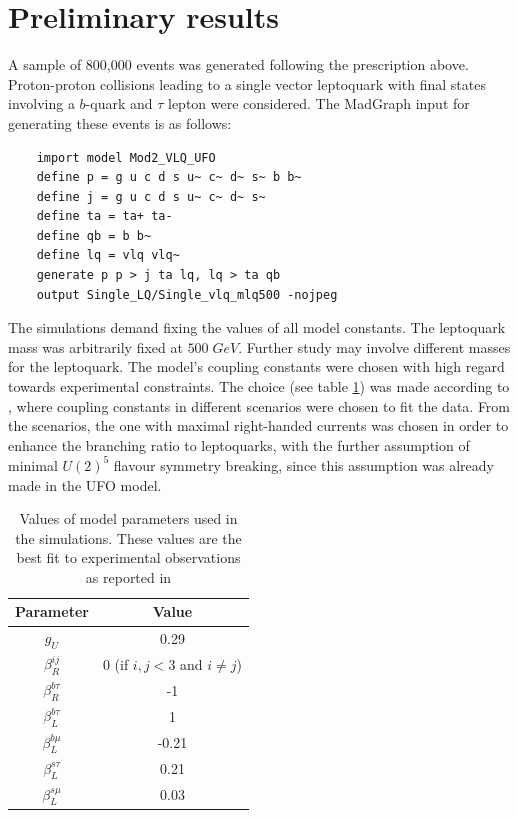 
\section*{Preliminary results}

A sample of 800,000 events was generated following the prescription above. Proton-proton collisions leading to a single vector leptoquark with final states involving a $b$-quark and $\tau$ lepton were considered. The MadGraph input for generating these events is as follows:
\begin{verbatim}
    import model Mod2_VLQ_UFO
    define p = g u c d s u~ c~ d~ s~ b b~
    define j = g u c d s u~ c~ d~ s~
    define ta = ta+ ta-
    define qb = b b~
    define lq = vlq vlq~
    generate p p > j ta lq, lq > ta qb
    output Single_LQ/Single_vlq_mlq500 -nojpeg
\end{verbatim}

The simulations demand fixing the values of all model constants. The leptoquark mass was arbitrarily fixed at $500\;\si{GeV}$. Further study may involve different masses for the leptoquark. The model's coupling constants were chosen with high regard towards experimental constraints. The choice (see table \ref{tab:parameters}) was made according to \cite{cornella_reading_2021}, where coupling constants in different scenarios were chosen to fit the data. From the scenarios, the one with maximal right-handed currents was chosen in order to enhance the branching ratio to leptoquarks, with the further assumption of minimal $U(2)^5$ flavour symmetry breaking, since this assumption was already made in the UFO model.

\begin{table}[ht]
    \centering
    \begin{tabular}{c|c}
        \toprule
        Parameter & Value \\ \midrule
        $g_U$ & 0.29 \\
        $\beta_R^{ij}$ & 0 (if $i,j<3$ and $i\neq j$)\\
        $\beta_R^{b\tau}$ & -1 \\
        $\beta_L^{b\tau}$ & 1 \\
        $\beta_L^{b\mu}$ & -0.21 \\
        $\beta_L^{s\tau}$ & 0.21 \\
        $\beta_L^{s\mu}$ & 0.03 \\ \bottomrule
    \end{tabular}
    \caption{Values of model parameters used in the simulations. These values are the best fit to experimental observations as reported in \cite{cornella_reading_2021}}
    \label{tab:parameters}
\end{table}

